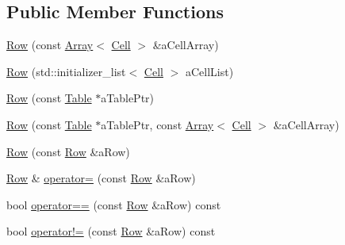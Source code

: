 \subsection*{Public Member Functions}
\begin{DoxyCompactItemize}
\item 
\mbox{\hyperlink{classlibrary_1_1core_1_1ctnr_1_1table_1_1_row_adec68d43f21630c441416acc5d78d355}{Row}} (const \mbox{\hyperlink{classlibrary_1_1core_1_1ctnr_1_1_array}{Array}}$<$ \mbox{\hyperlink{namespacelibrary_1_1core_1_1ctnr_1_1table_aac6007d595b2967513e8e6b89f6092f5}{Cell}} $>$ \&a\+Cell\+Array)
\item 
\mbox{\hyperlink{classlibrary_1_1core_1_1ctnr_1_1table_1_1_row_ae152205e7e611a0940aa1904584302f1}{Row}} (std\+::initializer\+\_\+list$<$ \mbox{\hyperlink{namespacelibrary_1_1core_1_1ctnr_1_1table_aac6007d595b2967513e8e6b89f6092f5}{Cell}} $>$ a\+Cell\+List)
\item 
\mbox{\hyperlink{classlibrary_1_1core_1_1ctnr_1_1table_1_1_row_aa2806926a212b8b010f48c9036ab7f54}{Row}} (const \mbox{\hyperlink{classlibrary_1_1core_1_1ctnr_1_1_table}{Table}} $\ast$a\+Table\+Ptr)
\item 
\mbox{\hyperlink{classlibrary_1_1core_1_1ctnr_1_1table_1_1_row_a5fdac640867ecc76f6c3dbf1bc043ef7}{Row}} (const \mbox{\hyperlink{classlibrary_1_1core_1_1ctnr_1_1_table}{Table}} $\ast$a\+Table\+Ptr, const \mbox{\hyperlink{classlibrary_1_1core_1_1ctnr_1_1_array}{Array}}$<$ \mbox{\hyperlink{namespacelibrary_1_1core_1_1ctnr_1_1table_aac6007d595b2967513e8e6b89f6092f5}{Cell}} $>$ \&a\+Cell\+Array)
\item 
\mbox{\hyperlink{classlibrary_1_1core_1_1ctnr_1_1table_1_1_row_aeed7c04310cf0bfa9b6448d623ab84c2}{Row}} (const \mbox{\hyperlink{classlibrary_1_1core_1_1ctnr_1_1table_1_1_row}{Row}} \&a\+Row)
\item 
\mbox{\hyperlink{classlibrary_1_1core_1_1ctnr_1_1table_1_1_row}{Row}} \& \mbox{\hyperlink{classlibrary_1_1core_1_1ctnr_1_1table_1_1_row_a6d6582a7ac4eba2bb7d6d34b1fa79b51}{operator=}} (const \mbox{\hyperlink{classlibrary_1_1core_1_1ctnr_1_1table_1_1_row}{Row}} \&a\+Row)
\item 
bool \mbox{\hyperlink{classlibrary_1_1core_1_1ctnr_1_1table_1_1_row_a0c4f807d7c22544609314c366a494ed8}{operator==}} (const \mbox{\hyperlink{classlibrary_1_1core_1_1ctnr_1_1table_1_1_row}{Row}} \&a\+Row) const
\item 
bool \mbox{\hyperlink{classlibrary_1_1core_1_1ctnr_1_1table_1_1_row_a2c7d630e88809a564300b3c61c5124c6}{operator!=}} (const \mbox{\hyperlink{classlibrary_1_1core_1_1ctnr_1_1table_1_1_row}{Row}} \&a\+Row) const

\end{DoxyCompactItemize}
